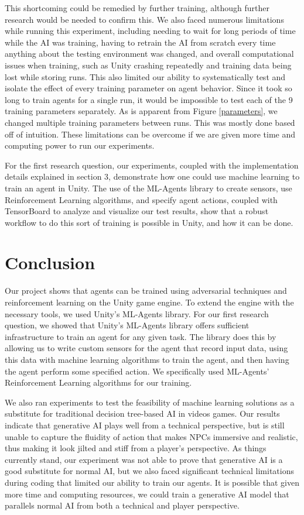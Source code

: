 \documentclass[a4paper,12pt,twocolumn]{article}
\begin{document}
This shortcoming could be remedied by further training, although further research would be needed to confirm this. We also faced numerous limitations while running this experiment, including needing to wait for long periods of time while the AI was training, having to retrain the AI from scratch every time anything about the testing environment was changed, and overall computational issues when training, such as Unity crashing repeatedly and training data being lost while storing runs. This also limited our ability to systematically test and isolate the effect of every training parameter on agent behavior. Since it took so long to train agents for a single run, it would be impossible to test each of the 9 training parameters separately. As is apparent from Figure \ref{parameters}, we changed multiple training parameters between runs. This was mostly done based off of intuition. These limitations can be overcome if we are given more time and computing power to run our experiments.

For the first research question, our experiments, coupled with the implementation details explained in section 3, demonstrate how one could use machine learning to train an agent in Unity. The use of the ML-Agents library to create sensors, use Reinforcement Learning algorithms, and specify agent actions, coupled with TensorBoard to analyze and visualize our test results, show that a robust workflow to do this sort of training is possible in Unity, and how it can be done.

\section{Conclusion}
Our project shows that agents can be trained using adversarial techniques and reinforcement learning on the Unity game engine. To extend the engine with the necessary tools, we used Unity's ML-Agents library. For our first research question, we showed that Unity's ML-Agents library offers sufficient infrastructure to train an agent for any given task. The library does this by allowing us to write custom sensors for the agent that record input data, using this data with machine learning algorithms to train the agent, and then having the agent perform some specified action. We specifically used ML-Agents' Reinforcement Learning algorithms for our training. 

We also ran experiments to test the feasibility of machine learning solutions as a substitute for traditional decision tree-based AI in videos games. Our results indicate that generative AI plays well from a technical perspective, but is still unable to capture the fluidity of action that makes NPCs immersive and realistic, thus making it look jilted and stiff from a player's perspective. As things currently stand, our experiment was not able to prove that generative AI is a good substitute for normal AI, but we also faced significant technical limitations during coding that limited our ability to train our agents. It is possible that given more time and computing resources, we could train a generative AI model that parallels normal AI from both a technical and player perspective.

\newpage
{}

  
\end{document}
